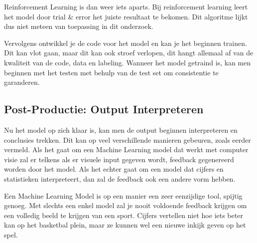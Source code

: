 \documentclass{hogent-article}
\begin{document}
Reinforcement Learning is dan weer iets aparts. Bij reinforcement learning leert het model door trial \& error het juiste resultaat te bekomen. Dit algoritme lijkt dus niet meteen van toepassing in dit onderzoek.

Vervolgens ontwikkel je de code voor het model en kan je het beginnen trainen. Dit kan vlot gaan, maar dit kan ook stroef verlopen, dit hangt allemaal af van de kwaliteit van de code, data en labeling. Wanneer het model getraind is, kan men beginnen met het testen met behulp van de test set om consistentie te garanderen.

\subsection{Post-Productie: Output Interpreteren}
Nu het model op zich klaar is, kan men de output beginnen interpreteren en conclusies trekken. Dit kan op veel verschillende manieren gebeuren, zoals eerder vermeld. Als het gaat om een Machine Learning model dat werkt met computer visie zal er telkens als er visuele input gegeven wordt, feedback gegenereerd worden door het model. Als het echter gaat om een model dat cijfers en statistieken interpreteert, dan zal de feedback ook een andere vorm hebben.

Een Machine Learning Model is op een manier een zeer eenzijdige tool, spijtig genoeg. Met slechts een enkel model zal je nooit voldoende feedback krijgen om een volledig beeld te krijgen van een sport. Cijfers vertellen niet hoe iets beter kan op het basketbal plein, maar ze kunnen wel een nieuwe inkijk geven op het spel.
\end{document}
